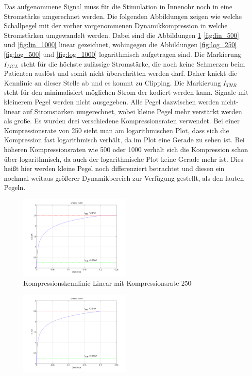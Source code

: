 \documentclass[conference]{IEEEtran}
\begin{document}
\begin{compactenum}[a)]
\newpage
\item Das aufgenommene Signal muss für die Stimulation in Innenohr noch in eine Stromstärke umgerechnet werden. Die folgenden Abbildungen zeigen wie welche Schallpegel mit der vorher vorgenommenen Dynamikkompression in welche Stromstärken umgewandelt werden. Dabei sind die Abbildungen \ref{fig:lin_250} \ref{fig:lin_500} und \ref{fig:lin_1000} linear gezeichnet, wohingegen die Abbildungen \ref{fig:log_250} \ref{fig:log_500} und \ref{fig:log_1000} logarithmisch aufgetragen sind. Die Markierung $I_{MCL}$ steht für die höchste zulässige Stromstärke, die noch keine Schmerzen beim Patienten auslöst und somit nicht überschritten werden darf. Daher knickt die Kennlinie an dieser Stelle ab und es kommt zu Clipping. Die Markierung $I_{THR}$ steht für den minimalisiert möglichen Strom der kodiert werden kann. Signale mit kleinerem Pegel werden nicht ausgegeben. Alle Pegel dazwischen werden nicht-linear auf Stromstärken umgerechnet, wobei kleine Pegel mehr verstärkt werden als große. Es wurden drei verschiedene Kompressionsraten verwendet. Bei einer Kompressionsrate von 250 sieht man am logarithmischen Plot, dass sich die Kompression fast logarithmisch verhält, da im Plot eine Gerade zu sehen ist. Bei höheren Kompressionsraten wie 500 oder 1000 verhält sich die Kompression schon über-logarithmisch, da auch der logarithmische Plot keine Gerade mehr ist. Dies heißt hier werden kleine Pegel noch differenziert betrachtet und diesen ein nochmal weitaus größerer Dynamikbereich zur Verfügung gestellt, als den lauten Pegeln.
\newpage
\begin{figure}
	\centering
	\includegraphics[width=0.5\textwidth]{img/lin_250.png}
	\vspace{-10pt}
	\caption{Kompressionskennlinie Linear mit Kompressionsrate 250}
	\vspace{-10pt}
	\label{fig:lin_250}
\end{figure}
\begin{figure}
	\centering
	\includegraphics[width=0.5\textwidth]{img/lin_500.png}

\end{figure}
\end{compactenum}
\end{document}
